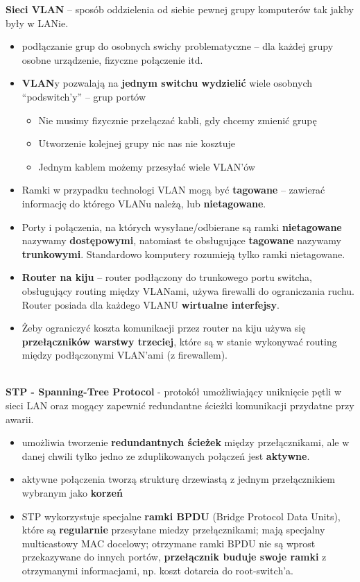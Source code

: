 \documentclass[main.tex]{subfiles}
\begin{document}
    \noindent \textbf{Sieci VLAN} -- sposób oddzielenia od siebie pewnej grupy komputerów tak jakby były w LANie.
    \begin{itemize}[noitemsep]
        \item podłączanie grup do osobnych swichy problematyczne -- dla każdej grupy osobne urządzenie, fizyczne połączenie itd.
        \item \textbf{VLAN}y pozwalają na \textbf{jednym switchu wydzielić} wiele osobnych ``podswitch'y'' -- grup portów
        \begin{itemize}[noitemsep]
            \item Nie musimy fizycznie przełączać kabli, gdy chcemy zmienić grupę
            \item Utworzenie kolejnej grupy nic nas nie kosztuje
            \item Jednym kablem możemy przesyłać wiele VLAN'ów
        \end{itemize}
        \item Ramki w przypadku technologi VLAN mogą być \textbf{tagowane} -- zawierać informację do którego VLANu należą,
        lub \textbf{nietagowane}.
        \item Porty i połączenia, na których wysyłane/odbierane są ramki \textbf{nietagowane} nazywamy \textbf{dostępowymi},
        natomiast te obsługujące \textbf{tagowane} nazywamy \textbf{trunkowymi}. Standardowo komputery rozumieją tylko
        ramki nietagowane.
        \item \textbf{Router na kiju} -- router podłączony do trunkowego portu switcha, obsługujący routing między
        VLANami, używa firewalli do ograniczania ruchu. Router posiada dla każdego VLANU \textbf{wirtualne interfejsy}.
        \item Żeby ograniczyć koszta komunikacji przez router na kiju używa się \textbf{przełączników warstwy trzeciej},
        które są w stanie wykonywać routing między podłączonymi VLAN'ami (z firewallem).
    \end{itemize}
    \hfill \\

    \noindent \textbf{STP - Spanning-Tree Protocol} - protokół umożliwiający uniknięcie pętli w sieci LAN
    oraz mogący zapewnić redundantne ścieżki komunikacji przydatne przy awarii.

    \begin{itemize}[noitemsep]
        \item umożliwia tworzenie \textbf{redundantnych ścieżek} między przełącznikami, ale w danej chwili tylko jedno ze
        zduplikowanych połączeń jest \textbf{aktywne}.
        \item aktywne połączenia tworzą strukturę drzewiastą z jednym przełącznikiem wybranym jako \textbf{korzeń}
        \item STP wykorzystuje specjalne \textbf{ramki BPDU} (Bridge Protocol Data Units), które są \textbf{regularnie}
        przesyłane miedzy przełącznikami; mają specjalny multicastowy MAC docelowy; otrzymane ramki BPDU nie są wprost
        przekazywane do innych portów, \textbf{przełącznik buduje swoje ramki} z otrzymanymi informacjami, np. koszt dotarcia do
        root-switch'a.
    \end{itemize}
\end{document}
